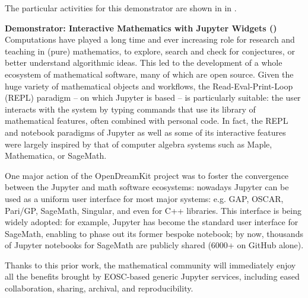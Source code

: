   The particular activities for this demonstrator are shown in
   in .

\medskip
\noindent\textbf{Demonstrator: Interactive Mathematics with Jupyter Widgets ()}\label{sec:concept-demonstrator-math}\\
  Computations have played a long time and ever increasing role for
  research and teaching in (pure) mathematics, to explore, search and
  check for conjectures, or better understand algorithmic ideas. This
  led to the development of a whole ecosystem of mathematical
  software, many of which are open source. Given the huge variety of
  mathematical objects and workflows, the Read-Eval-Print-Loop (REPL)
  paradigm -- on which Jupyter is based -- is particularly suitable:
  the user interacts with the system by typing commands that use its
  library of mathematical features, often combined with personal code.
  In fact, the REPL and notebook paradigms of Jupyter as well as some
  of its interactive features were largely inspired by that of
  computer algebra systems such as Maple, Mathematica, or SageMath.

  One major action of the OpenDreamKit project was to foster the
  convergence between the Jupyter and math software ecosystems:
  nowadays Jupyter can be used as a uniform user interface for most
  major systems: e.g. GAP, OSCAR, Pari/GP, SageMath, Singular, and
  even for C++ libraries. This interface is being widely adopted: for
  example, Jupyter has become the standard user interface for
  SageMath, enabling to phase out its former bespoke notebook; by now,
  thousands of Jupyter notebooks for SageMath are publicly shared
  (6000+ on GitHub alone).

  Thanks to this prior work, the mathematical community will
  immediately enjoy all the benefits brought by EOSC-based generic
  Jupyter services, including eased collaboration, sharing, archival,
  and reproducibility.

